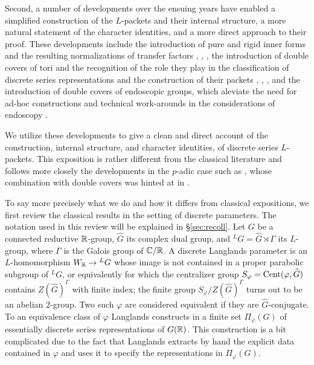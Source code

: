 \documentclass{article}
\theoremstyle{definition}
\numberwithin{equation}{section}
\renewcommand{\-}{\hyp{}}
\begin{document}
Second, a number of developments over the ensuing years have enabled a simplified construction of the $L$\-packets and their internal structure, a more natural statement of the character identities, and a more direct approach to their proof. These developments include the introduction of pure and rigid inner forms and the resulting normalizations of transfer factors \cite{Vog93}, \cite{KalECI}, \cite{KalRI}, the introduction of double covers of tori and the recognition of the role they play in the classification of discrete series representations and the construction of their packets \cite{AV92}, \cite{AV16}, \cite{KalDC}, and the introduction of double covers of endoscopic groups, which aleviate the need for ad-hoc constructions and technical work-arounds in the considerations of endoscopy \cite{KalHDC}. 

We utilize these developments to give a clean and direct account of the construction, internal structure, and character identities, of discrete series $L$\-packets. This exposition is rather different from the classical literature and follows more closely the developments in the $p$-adic case such as \cite{KalRSP}, whose combination with double covers was hinted at in \cite{KalDC}.

To say more precisely what we do and how it differs from classical expositions, we first review the classical results in the setting of discrete parameters. The notation used in this review will be explained in \S\ref{sec:recoll}. Let $G$ be a connected reductive $\mathbb{R}$-group, $\hat G$ its complex dual group, and $^LG=\hat G \rtimes \Gamma$ its $L$\-group, where $\Gamma$ is the Galois group of $\mathbb{C}/\mathbb{R}$. A discrete Langlands parameter is an $L$\-homomorphism $W_{\mathbb{R}} \to {^LG}$ whose image is not contained in a proper parabolic subgroup of $^LG$, or equivalently for which the centralizer group $S_\varphi=\textrm{Cent}(\varphi,\widehat G)$ contains $Z(\hat G)^\Gamma$ with finite index; the finite group $S_\varphi/Z(\hat G)^\Gamma$ turns out to be an abelian $2$-group. Two such $\varphi$ are considered equivalent if they are $\hat G$-conjugate. To an equivalence class of $\varphi$ Langlands constructs in \cite[\S3]{Lan89} a finite set $\Pi_\varphi(G)$ of essentially discrete series representations of $G(\mathbb{R})$. This construction is a bit complicated due to the fact that Langlands extracts by hand the explicit data contained in $\varphi$ and uses it to specify the representations in $\Pi_\varphi(G)$.
\end{document}
